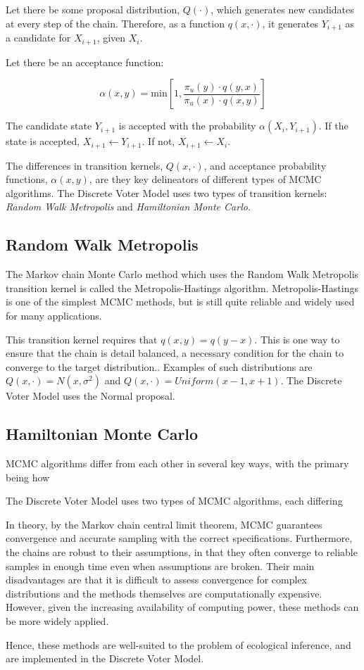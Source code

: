Let there be some proposal distribution, $Q(\cdot)$, which generates new candidates at every step of the chain. Therefore, as a function $q(x, \cdot)$, it generates $Y_{i + 1}$ as a candidate for $X_{i + 1}$, given $X_i$.

Let there be an acceptance function:

$$\alpha(x, y) = \text{min}\left[1, \frac{\pi_u(y) \cdot q(y, x)}{\pi_u(x) \cdot q(x, y)}\right]$$

The candidate state $Y_{i + 1}$ is accepted with the probability $\alpha(X_i, Y_{i + 1})$. If the state is accepted, $X_{i + 1} \leftarrow Y_{i + 1}$. If not, $X_{i + 1} \leftarrow X_{i}$.

The differences in transition kernels, $Q(x, \cdot)$, and acceptance probability functions, $\alpha(x, y)$, are they key delineators of different types of MCMC algorithms. The Discrete Voter Model uses two types of transition kernels: \textit{Random Walk Metropolis} and \textit{Hamiltonian Monte Carlo}.

\subsection{Random Walk Metropolis}

The Markov chain Monte Carlo method which uses the Random Walk Metropolis transition kernel is called the Metropolis-Hastings algorithm. Metropolis-Hastings is one of the simplest MCMC methods, but is still quite reliable and widely used for many applications.

This transition kernel requires that $q(x, y) = q(y - x)$. This is one way to ensure that the chain is detail balanced, a necessary condition for the chain to converge to the target distribution.\cite{mcmc_rwm}. Examples of such distributions are $Q(x, \cdot) = N(x, \sigma^2)$ and $Q(x, \cdot) = Uniform(x - 1, x + 1)$. The Discrete Voter Model uses the Normal proposal.

\subsection{Hamiltonian Monte Carlo}


MCMC algorithms differ from each other in several key ways, with the primary being how

The Discrete Voter Model uses two types of MCMC algorithms, each differing


In theory, by the Markov chain central limit theorem, MCMC guarantees convergence and accurate sampling with the correct specifications. Furthermore, the chains are robust to their assumptions, in that they often converge to reliable samples in enough time even when assumptions are broken. Their main disadvantages are that it is difficult to assess convergence for complex distributions and the methods themselves are computationally expensive. However, given the increasing availability of computing power, these methods can be more widely applied.

Hence, these methods are well-suited to the problem of ecological inference, and are implemented in the Discrete Voter Model.
